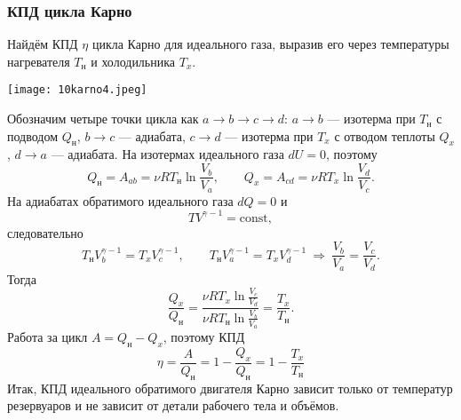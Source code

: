 \documentclass[12pt, a4paper]{article}%
\begin{document}
\subsubsection*{КПД цикла Карно}
Найдём КПД $\eta$ цикла Карно для идеального газа, выразив его через температуры нагревателя $T_{\text{н}}$ и холодильника $T_x$.

\begin{center}
\texttt{[image: 10karno4.jpeg]}
\label{fig:mpr}
\end{center}

Обозначим четыре точки цикла как $a\to b\to c\to d$: $a\to b$ — изотерма при $T_{\text{н}}$ с подводом $Q_{\text{н}}$, $b\to c$ — адиабата, $c\to d$ — изотерма при $T_x$ с отводом теплоты $Q_x$, $d\to a$ — адиабата. На изотермах идеального газа $dU=0$, поэтому
\[
Q_{\text{н}}= A_{ab} =\nu R T_{\text{н}}\ln\frac{V_b}{V_a},\qquad
Q_x=A_{cd} = \nu R T_x\ln\frac{V_d}{V_c}.
\]
На адиабатах обратимого идеального газа $dQ=0$ и
\[
T V^{\gamma-1}=\text{const},
\]
следовательно
\[
T_{\text{н}}V_b^{\gamma-1}=T_xV_c^{\gamma-1},\qquad
T_{\text{н}}V_a^{\gamma-1}=T_xV_d^{\gamma-1}
\ \Rightarrow\ 
\frac{V_b}{V_a}=\frac{V_c}{V_d}.
\]
Тогда
\[
\frac{Q_x}{Q_{\text{н}}}=\frac{\nu R T_x\ln\frac{V_c}{V_d}}{\nu R T_{\text{н}}\ln\frac{V_b}{V_a}}=\frac{T_x}{T_{\text{н}}}.
\]
Работа за цикл $A=Q_{\text{н}}-Q_x$, поэтому КПД
\[
\boxed{\eta=\frac{A}{Q_{\text{н}}}=1-\frac{Q_x}{Q_{\text{н}}}
=1-\frac{T_x}{T_{\text{н}}}}
\]
Итак, КПД идеального обратимого двигателя Карно зависит только от температур резервуаров и не зависит от детали рабочего тела и объёмов.
\end{document}
